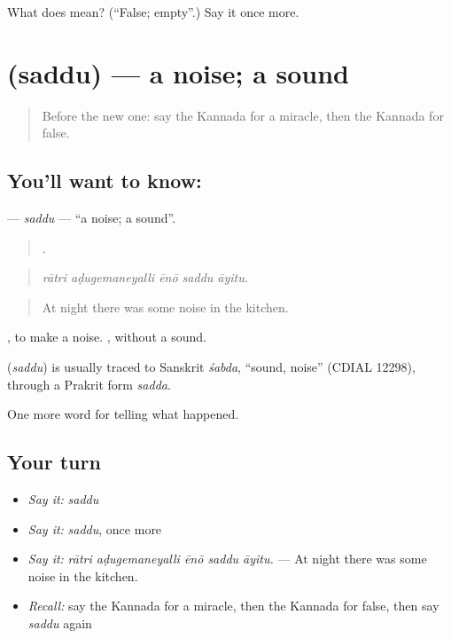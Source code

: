 \begin{tcolorbox}[breakable,colback=teal!4,colframe=teal!35!black,title={Before you move on}]
What does  mean? (\textquotedblleft{}False; empty\textquotedblright{}.) Say it once more.
\end{tcolorbox}
\section[\texorpdfstring{\kn{ಸದ್ದು} (saddu)}{ಸದ್ದು (saddu)}]{ (saddu) — a noise; a sound}

\label{lesson:KA-C374-saddu}



\begin{quote}
Before the new one: say the Kannada for a miracle, then the Kannada for false.
\end{quote}

\subsection*{You'll want to know: }
\textbf{} — \emph{saddu} — \textquotedblleft{}a noise; a sound\textquotedblright{}.

\begin{quote}
    .
\end{quote}

\begin{quote}
\emph{rātri aḍugemaneyalli ēnō saddu āyitu.}
\end{quote}

\begin{quote}
At night there was some noise in the kitchen.
\end{quote}

 , to make a noise. , without a sound.

\begin{cousinweb}
\textbf{} (\emph{saddu}) is usually traced to Sanskrit \emph{śabda}, \textquotedblleft{}sound, noise\textquotedblright{} (CDIAL 12298), through a Prakrit form \emph{sadda}.
\end{cousinweb}

\begin{grammarlens}[title={What you've built}]
One more word for telling what happened.
\end{grammarlens}

\subsection*{Your turn}
\begin{itemize}
\raggedright
  \item \emph{Say it:} \emph{saddu}
  \item \emph{Say it:} \emph{saddu}, once more
  \item \emph{Say it:} \emph{rātri aḍugemaneyalli ēnō saddu āyitu.} — At night there was some noise in the kitchen.
  \item \emph{Recall:} say the Kannada for a miracle, then the Kannada for false, then say \emph{saddu} again
\end{itemize}

